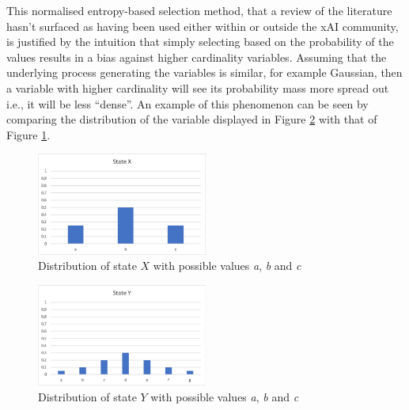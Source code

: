 This normalised entropy-based selection method, that a review of the literature hasn't surfaced as having been used either within or outside the xAI community, is justified by the intuition that simply selecting based on the probability of the values results in a bias against higher cardinality variables.
Assuming that the underlying process generating the variables is similar, for example Gaussian, then a variable with higher cardinality will see its probability mass more spread out i.e., it will be less \enquote{dense}.
An example of this phenomenon can be seen by comparing the distribution of the variable displayed in Figure \ref{fig:entropy-example-2} with that of Figure \ref{fig:entropy-example-1}.

\begin{figure}[htbp]
\centerline{\includegraphics[width=0.5\textwidth]{methodology/images/entropy-example-1}}
\caption{Distribution of state $X$ with possible values \textit{a}, \textit{b} and \textit{c}}
\label{fig:entropy-example-1}
\end{figure}

\begin{figure}[htbp]
\centerline{\includegraphics[width=0.5\textwidth]{methodology/images/entropy-example-2}}
\caption{Distribution of state $Y$ with possible values \textit{a}, \textit{b} and \textit{c}}
\label{fig:entropy-example-2}
\end{figure}


